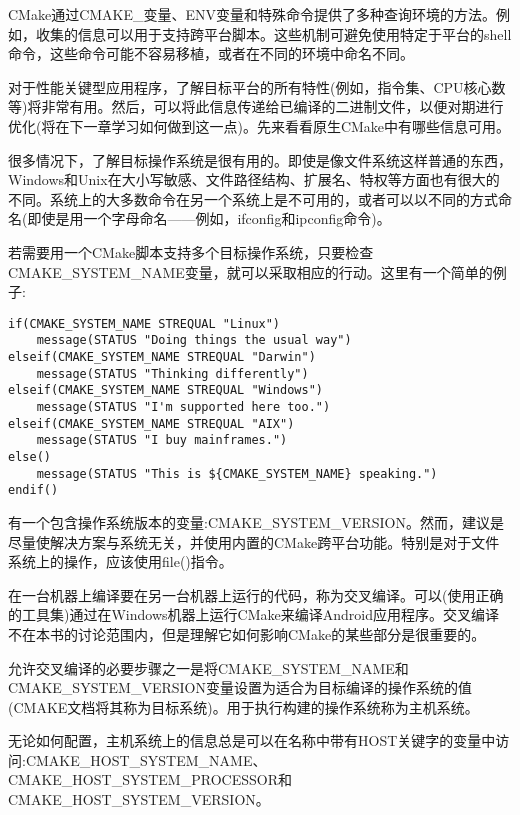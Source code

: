 
CMake通过CMAKE\_变量、ENV变量和特殊命令提供了多种查询环境的方法。例如，收集的信息可以用于支持跨平台脚本。这些机制可避免使用特定于平台的shell命令，这些命令可能不容易移植，或者在不同的环境中命名不同。

对于性能关键型应用程序，了解目标平台的所有特性(例如，指令集、CPU核心数等)将非常有用。然后，可以将此信息传递给已编译的二进制文件，以便对期进行优化(将在下一章学习如何做到这一点)。先来看看原生CMake中有哪些信息可用。


很多情况下，了解目标操作系统是很有用的。即使是像文件系统这样普通的东西，Windows和Unix在大小写敏感、文件路径结构、扩展名、特权等方面也有很大的不同。系统上的大多数命令在另一个系统上是不可用的，或者可以以不同的方式命名(即使是用一个字母命名——例如，ifconfig和ipconfig命令)。

若需要用一个CMake脚本支持多个目标操作系统，只要检查CMAKE\_SYSTEM\_NAME变量，就可以采取相应的行动。这里有一个简单的例子:

\begin{lstlisting}[style=styleCMake]
if(CMAKE_SYSTEM_NAME STREQUAL "Linux")
	message(STATUS "Doing things the usual way")
elseif(CMAKE_SYSTEM_NAME STREQUAL "Darwin")
	message(STATUS "Thinking differently")
elseif(CMAKE_SYSTEM_NAME STREQUAL "Windows")
	message(STATUS "I'm supported here too.")
elseif(CMAKE_SYSTEM_NAME STREQUAL "AIX")
	message(STATUS "I buy mainframes.")
else()
	message(STATUS "This is ${CMAKE_SYSTEM_NAME} speaking.")
endif()
\end{lstlisting}

有一个包含操作系统版本的变量:CMAKE\_SYSTEM\_VERSION。然而，建议是尽量使解决方案与系统无关，并使用内置的CMake跨平台功能。特别是对于文件系统上的操作，应该使用file()指令。


在一台机器上编译要在另一台机器上运行的代码，称为交叉编译。可以(使用正确的工具集)通过在Windows机器上运行CMake来编译Android应用程序。交叉编译不在本书的讨论范围内，但是理解它如何影响CMake的某些部分是很重要的。

允许交叉编译的必要步骤之一是将CMAKE\_SYSTEM\_NAME和CMAKE\_SYSTEM\_VERSION变量设置为适合为目标编译的操作系统的值(CMAKE文档将其称为目标系统)。用于执行构建的操作系统称为主机系统。

无论如何配置，主机系统上的信息总是可以在名称中带有HOST关键字的变量中访问:CMAKE\_HOST\_SYSTEM\_NAME、CMAKE\_HOST\_SYSTEM\_PROCESSOR和CMAKE\_HOST\_SYSTEM\_VERSION。

